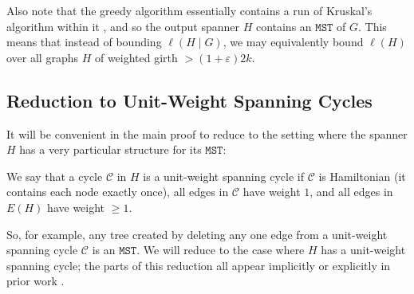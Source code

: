 \documentclass{article}\usepackage[a4paper,margin=20mm]{geometry}
\newcommand{\eps}{\varepsilon}
\newcommand{\cee}{\mathcal{C}}
\newcommand{\mst}{\texttt{MST}}
\begin{document}
Also note that the greedy algorithm essentially contains a run of Kruskal's algorithm within it \cite{CLRS22}, and so the output spanner $H$ contains an $\mst$ of $G$.
This means that instead of bounding $\ell(H \mid G)$, we may equivalently bound $\ell(H)$ over all graphs $H$ of weighted girth $>(1+\eps)2k$.

\subsection{Reduction to Unit-Weight Spanning Cycles \label{sec:utmst}}

It will be convenient in the main proof to reduce to the setting where the spanner $H$ has a very particular structure for its $\mst$:

\begin{definition} 
We say that a cycle $\cee$ in $H$ is a unit-weight spanning cycle if $\cee$ is Hamiltonian (it contains each node exactly once), all edges in $\cee$ have weight $1$, and all edges in $E(H)$ have weight $\ge 1$.
\end{definition}
So, for example, any tree created by deleting any one edge from a unit-weight spanning cycle $\cee$ is an $\mst$.
We will reduce to the case where $H$ has a unit-weight spanning cycle; the parts of this reduction all appear implicitly or explicitly in prior work \cite{CW18, LS23, ENS15}.
\end{document}
